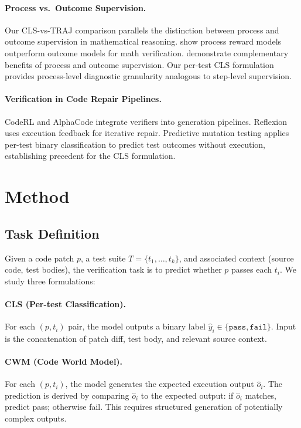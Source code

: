 \documentclass[11pt]{article}
\begin{document}
\paragraph{Process vs.\ Outcome Supervision.}
Our CLS-vs-TRAJ comparison parallels the distinction between process and outcome supervision in mathematical reasoning. \citet{lightman2023lets} show process reward models outperform outcome models for math verification. \citet{uesato2022solving} demonstrate complementary benefits of process and outcome supervision. Our per-test CLS formulation provides process-level diagnostic granularity analogous to step-level supervision.

\paragraph{Verification in Code Repair Pipelines.}
CodeRL \citep{le2022coderl} and AlphaCode \citep{li2022competition} integrate verifiers into generation pipelines. Reflexion \citep{shinn2023reflexion} uses execution feedback for iterative repair. Predictive mutation testing \citep{zhang2023predictive} applies per-test binary classification to predict test outcomes without execution, establishing precedent for the CLS formulation.

\section{Method}

\subsection{Task Definition}

Given a code patch $p$, a test suite $T = \{t_1, \ldots, t_k\}$, and associated context (source code, test bodies), the verification task is to predict whether $p$ passes each $t_i$. We study three formulations:

\paragraph{CLS (Per-test Classification).} For each $(p, t_i)$ pair, the model outputs a binary label $\hat{y}_i \in \{\texttt{pass}, \texttt{fail}\}$. Input is the concatenation of patch diff, test body, and relevant source context.

\paragraph{CWM (Code World Model).} For each $(p, t_i)$, the model generates the expected execution output $\hat{o}_i$. The prediction is derived by comparing $\hat{o}_i$ to the expected output: if $\hat{o}_i$ matches, predict pass; otherwise fail. This requires structured generation of potentially complex outputs.
\end{document}
